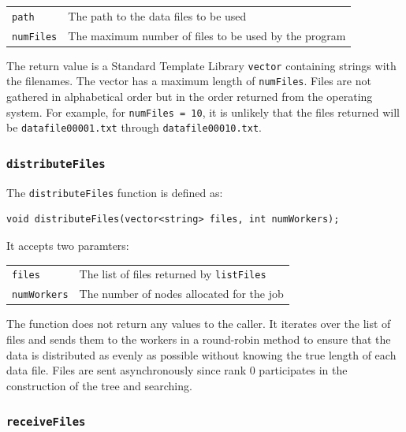 \documentclass{article}
\begin{document}
\begin{tabular}{l l}
\texttt{path} & The path to the data files to be used \\
\texttt{numFiles} & The maximum number of files to be used by the program \\
\end{tabular}

The return value is a Standard Template Library \texttt{vector} containing strings with the filenames. The vector has a maximum length of \texttt{numFiles}. Files are not gathered in alphabetical order but in the order returned from the operating system. For example, for \texttt{numFiles = 10}, it is unlikely that the files returned will be \texttt{datafile00001.txt} through \texttt{datafile00010.txt}.


%
%

\subsubsection{\texttt{distributeFiles}}\label{sec:distributefiles}

The \texttt{distributeFiles} function is defined as:

\lstset{language=C++, keepspaces=true}
\begin{lstlisting}
void distributeFiles(vector<string> files, int numWorkers);
\end{lstlisting}

It accepts two paramters:

\begin{tabular}{l l}
\texttt{files} & The list of files returned by \texttt{listFiles} \\
\texttt{numWorkers} & The number of nodes allocated for the job \\
\end{tabular}

The function does not return any values to the caller. It iterates over the list of files and sends them to the workers in a round-robin method to ensure that the data is distributed as evenly as possible without knowing the true length of each data file. Files are sent asynchronously since rank 0 participates in the construction of the tree and searching.


%
%

\subsubsection{\texttt{receiveFiles}}\label{sec:receivefiles}
\end{document}
